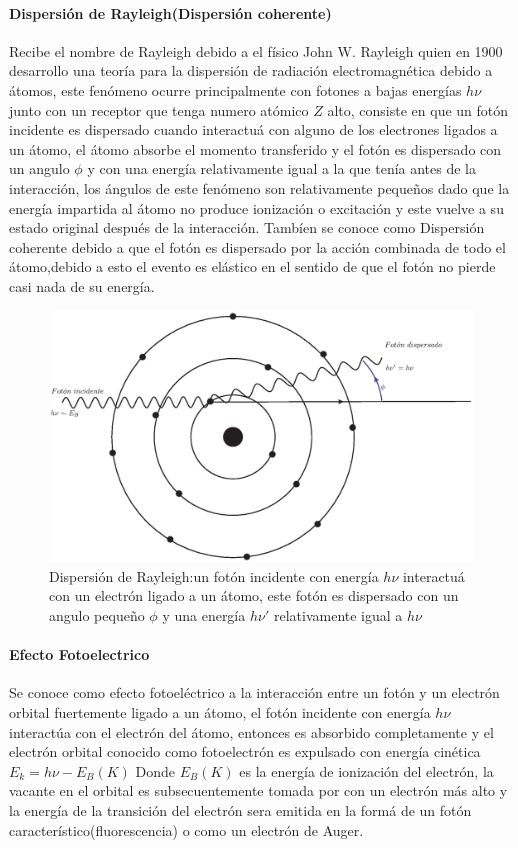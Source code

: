 \paragraph{Dispersión de Rayleigh(Dispersión coherente)}
Recibe el nombre de Rayleigh debido a el físico John W. Rayleigh quien en 1900 desarrollo una teoría para la dispersión de radiación electromagnética debido a átomos, este fenómeno ocurre principalmente con fotones a bajas energías $h\nu$ junto con un receptor que tenga numero atómico $Z$ alto, consiste en que un fotón incidente es dispersado cuando interactuá con alguno de los electrones ligados a un átomo, el átomo absorbe el momento transferido y el fotón es dispersado con un angulo $\phi$ y con una energía relativamente igual a la que tenía antes de la interacción, los ángulos de este fenómeno son relativamente pequeños dado que la energía impartida al átomo no produce ionización o excitación y este vuelve a su estado original después de la interacción\cite{Podgorsak}.
Tambíen se conoce como Dispersión coherente debido a que el fotón es dispersado por  la acción combinada de todo el átomo,debido a esto el evento es elástico en el sentido de que el fotón no pierde casi nada de su energía\cite{Frank}.

\begin{figure}[htbp]
    \centering
    \includegraphics[width=.71\linewidth]{./Figures/Ray.eps}
    \caption[Dispersión de Rayleigh]{Dispersión de Rayleigh:un fotón incidente con energía $h\nu$ interactuá con un electrón ligado a un átomo, este fotón es dispersado con un angulo pequeño $\phi$ y una energía $h\nu '$ relativamente igual a $h\nu$ }
    \label{fig:DR}
\end{figure}


\paragraph{Efecto Fotoelectrico}

Se conoce como efecto fotoeléctrico a la interacción entre un fotón y un electrón orbital fuertemente ligado a un átomo, el fotón incidente con energía $h\nu$ interactúa con el electrón del átomo, entonces es absorbido completamente y el electrón orbital conocido como fotoelectrón es expulsado con energía cinética $E_k=h\nu-E_B(K)$ Donde $E_B(K)$ es la energía de ionización del electrón, la vacante en el orbital es subsecuentemente tomada por con un electrón más alto y la energía de la transición del electrón sera emitida en la formá de un fotón característico(fluorescencia) o como un electrón de Auger.

